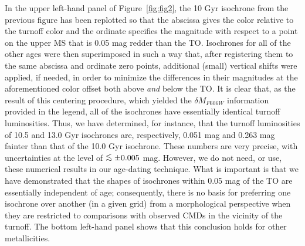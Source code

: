 \documentclass[12pt,preprint]{aastex}
\newcommand\lta{\mathrel{\hbox{\raise 0.6 ex \hbox{$<$}\kern
                   -1.8 ex\lower .5 ex\hbox{$\sim$}}}}
\begin{document}
In the upper left-hand panel of Figure~\ref{fig:fig2}, the 10 Gyr isochrone from
the previous figure has been replotted so that the abscissa gives the color
relative to the turnoff color and the ordinate specifies the magnitude with
respect to a point on the upper MS that is 0.05 mag redder than the TO. 
Isochrones for all of the other ages were then superimposed in such a way that,
after registering them to the same abscissa and ordinate zero points, additional
(small) vertical shifts were applied, if needed, in order to minimize the
differences in their magnitudes at the aforementioned color offset both above
{\it and} below the TO.  It is clear that, as the result of this centering
procedure, which yielded the $\delta M_{F606W}$ information provided in the
legend, all of the isochrones have essentially identical turnoff luminosities.
Thus, we have determined, for instance, that the turnoff luminosities of 10.5
and 13.0 Gyr isochrones are, respectively, 0.051 mag and 0.263 mag fainter than
that of the 10.0 Gyr isochrone.  These numbers are very precise, with
uncertainties at the level of $\lta \pm 0.005$ mag.  However, we do not need,
or use, these numerical results in our age-dating technique.  What is important
is that we have demonstrated that the shapes of isochrones within 0.05 mag of
the TO are essentially independent of age; consequently, there is no basis for
preferring one isochrone over another (in a given grid) from a morphological
perspective when they are restricted to comparisons with observed CMDs in the
vicinity of the turnoff.  The bottom left-hand panel shows that this conclusion
holds for other metallicities.
\end{document}
